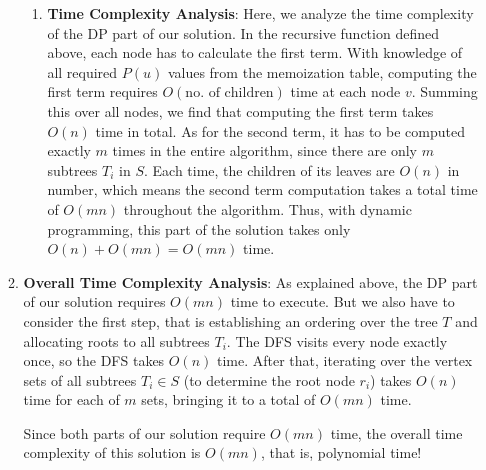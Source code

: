 \documentclass[11pt, fleqn]{article}
\begin{document}
\begin{itemize}
\begin{enumerate}
\begin{enumerate}
            \item \textbf{Time Complexity Analysis}: Here, we analyze the time complexity of the DP part of our solution. In the recursive function defined above, each node has to calculate the first term. With knowledge of all required $P(u)$ values from the memoization table, computing the first term requires $O(\text{no. of children})$ time at each node $v$. Summing this over all nodes, we find that computing the first term takes $O(n)$ time in total. As for the second term, it has to be computed exactly $m$ times in the entire algorithm, since there are only $m$ subtrees $T_i$ in $S$. Each time, the children of its leaves are $O(n)$ in number, which means the second term computation takes a total time of $O(mn)$ throughout the algorithm. Thus, with dynamic programming, this part of the solution takes only $O(n)+O(mn)=O(mn)$ time.
        \end{enumerate}
        
        \item \textbf{Overall Time Complexity Analysis}: As explained above, the DP part of our solution requires $O(mn)$ time to execute. But we also have to consider the first step, that is establishing an ordering over the tree $T$ and allocating roots to all subtrees $T_i$. The DFS visits every node exactly once, so the DFS takes $O(n)$ time. After that, iterating over the vertex sets of all subtrees $T_i\in S$ (to determine the root node $r_i$) takes $O(n)$ time for each of $m$ sets, bringing it to a total of $O(mn)$ time.
        
        Since both parts of our solution require $O(mn)$ time, the overall time complexity of this solution is $O(mn)$, that is, polynomial time!
    \end{enumerate}
    
\end{itemize}
\end{document}
